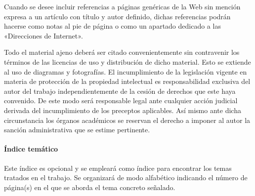 Cuando se desee incluir referencias a páginas genéricas de la Web sin mención expresa a un artículo con título y autor definido, dichas referencias podrán hacerse como notas al pie de página o como un apartado dedicado a las «Direcciones de Internet».

Todo el material ajeno deberá ser citado convenientemente sin contravenir los términos de las licencias de uso y distribución de dicho material. Esto se extiende al uso de diagramas y fotografías. El incumplimiento de la legislación vigente en materia de protección de la propiedad intelectual es responsabilidad exclusiva del autor del trabajo independientemente de la cesión de derechos que este haya convenido. De este modo será responsable legal ante cualquier acción judicial derivada del incumplimiento de los preceptos aplicables. Así mismo ante dicha circunstancia los órganos académicos se reservan el derecho a imponer al autor la sanción administrativa que se estime pertinente.

\nocite{*}

\paragraph{Índice temático}
Este índice es opcional y se empleará como índice para encontrar los temas tratados en el trabajo. Se organizará de modo alfabético indicando el número de página(s) en el que se aborda el tema concreto señalado.
